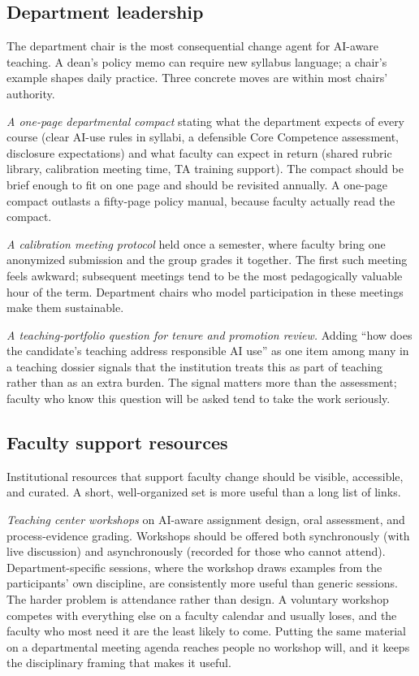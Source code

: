 \documentclass{SIAMbook2023}
\begin{document}
\subsection{Department leadership}
\label{u:subsec:dept-leadership}

The department chair is the most consequential change agent for AI-aware teaching. A dean's policy memo can require new syllabus language; a chair's example shapes daily practice. Three concrete moves are within most chairs' authority.

\textit{A one-page departmental compact} stating what the department expects of every course (clear AI-use rules in syllabi, a defensible Core Competence assessment, disclosure expectations) and what faculty can expect in return (shared rubric library, calibration meeting time, TA training support). The compact should be brief enough to fit on one page and should be revisited annually. A one-page compact outlasts a fifty-page policy manual, because faculty actually read the compact.

\textit{A calibration meeting protocol} held once a semester, where faculty bring one anonymized submission and the group grades it together. The first such meeting feels awkward; subsequent meetings tend to be the most pedagogically valuable hour of the term. Department chairs who model participation in these meetings make them sustainable.

\textit{A teaching-portfolio question for tenure and promotion review.} Adding ``how does the candidate's teaching address responsible AI use'' as one item among many in a teaching dossier signals that the institution treats this as part of teaching rather than as an extra burden. The signal matters more than the assessment; faculty who know this question will be asked tend to take the work seriously.

\subsection{Faculty support resources}
\label{u:subsec:support-resources}

Institutional resources that support faculty change should be visible, accessible, and curated. A short, well-organized set is more useful than a long list of links.

\textit{Teaching center workshops} on AI-aware assignment design, oral assessment, and process-evidence grading. Workshops should be offered both synchronously (with live discussion) and asynchronously (recorded for those who cannot attend). Department-specific sessions, where the workshop draws examples from the participants' own discipline, are consistently more useful than generic sessions. The harder problem is attendance rather than design. A voluntary workshop competes with everything else on a faculty calendar and usually loses, and the faculty who most need it are the least likely to come. Putting the same material on a departmental meeting agenda reaches people no workshop will, and it keeps the disciplinary framing that makes it useful.
\end{document}
